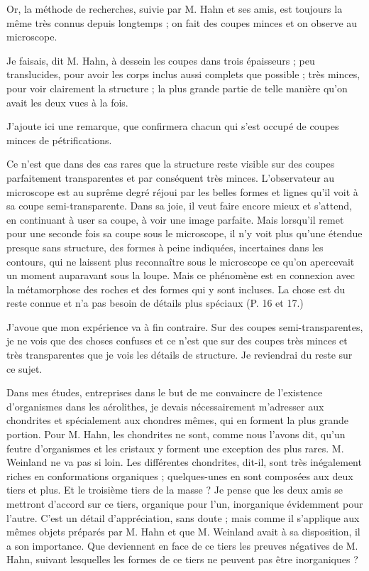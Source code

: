 \documentclass[a4paper, 12pt, oneside, french]{article}
\begin{document}
Or, la méthode de recherches, suivie par M. Hahn et ses amis, est toujours la même très connus depuis longtemps ; on fait des coupes minces et on observe au microscope.

\og Je faisais, dit M. Hahn, à dessein les coupes dans trois épaisseurs ; peu translucides, pour avoir les corps inclus aussi complets que possible ; très minces, pour voir clairement la structure ; la plus grande partie de telle manière qu'on avait les deux vues à la fois. \fg

\og J'ajoute ici une remarque, que confirmera chacun qui s'est occupé de coupes minces de pétrifications. \fg

\og Ce n'est que dans des cas rares que la structure reste visible sur des coupes parfaitement transparentes et par conséquent très minces. L'observateur au microscope est au suprême degré réjoui par les belles formes et lignes qu'il voit à sa coupe semi-transparente. Dans sa joie, il veut faire encore mieux et s'attend, en continuant à user sa coupe, à voir une image parfaite. Mais lorsqu'il remet pour une seconde fois sa coupe sous le microscope, il n'y voit plus qu'une étendue presque sans structure, des formes à peine indiquées, incertaines dans les contours, qui ne laissent plus reconnaître sous le microscope ce qu'on apercevait un moment auparavant sous la loupe. Mais ce phénomène est en connexion avec la métamorphose des roches et des formes qui y sont incluses. La chose est du reste connue et n'a pas besoin de détails plus spéciaux \fg (P. 16 et 17.)

J'avoue que mon expérience va à fin contraire. Sur des coupes semi-transparentes, je ne vois que des choses confuses et ce n'est que sur des coupes très minces et très transparentes que je vois les détails de structure. Je reviendrai du reste sur ce sujet.

Dans mes études, entreprises dans le but de me convaincre de l'existence d'organismes dans les aérolithes, je devais nécessairement m'adresser aux chondrites et spécialement aux chondres mêmes, qui en forment la plus grande portion. Pour M. Hahn, les chondrites ne sont, comme nous l'avons dit, qu'un \og feutre d'organismes \fg et les cristaux y forment une exception des plus rares. M. Weinland ne va pas si loin. \og Les différentes chondrites, dit-il, sont très inégalement riches en conformations organiques ; quelques-unes en sont composées aux deux tiers et plus. \fg Et le troisième tiers de la masse ? Je pense que les deux amis se mettront d'accord sur ce tiers, organique pour l'un, inorganique évidemment pour l'autre. C'est un détail d'appréciation, sans doute ; mais comme il s'applique aux mêmes objets préparés par M. Hahn et que M. Weinland avait à sa disposition, il a son importance. Que deviennent en face de ce tiers les preuves négatives de M. Hahn, suivant lesquelles les formes de ce tiers ne peuvent pas être inorganiques ?
\end{document}
